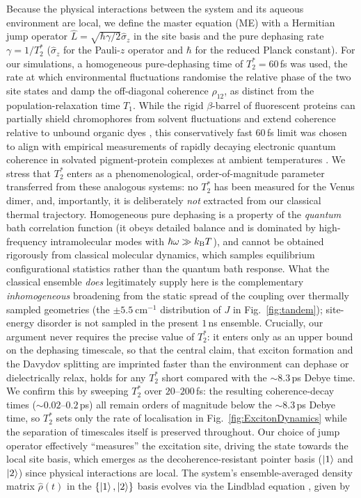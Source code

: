 \documentclass[journal=jpcbfk, manuscript=article, layout=twocolumn, doi=true]{achemso}
\begin{document}
Because the physical interactions between the system and its aqueous environment are local, we define the master equation (ME) with a Hermitian jump operator $\hat{L} = \sqrt{\hbar \gamma / 2} \hat{\sigma}_z$ in the site basis and the pure dephasing rate $\gamma = 1/T_2^*$ ($\hat{\sigma}_z$ for the Pauli-$z$ operator and $\hbar$ for the reduced Planck constant). For our simulations, a homogeneous pure-dephasing time of $T_2^* = 60$\,fs was used, the rate at which environmental fluctuations randomise the relative phase of the two site states and damp the off-diagonal coherence $\rho_{12}$, as distinct from the population-relaxation time $T_1$. While the rigid $\beta$-barrel of fluorescent proteins can partially shield chromophores from solvent fluctuations and extend coherence relative to unbound organic dyes \cite{kim2019venusa206}, this conservatively fast $60$\,fs limit was chosen to align with empirical measurements of rapidly decaying electronic quantum coherence in solvated pigment-protein complexes at ambient temperatures \cite{duan2017nature}. {We stress that $T_2^*$ enters as a phenomenological, order-of-magnitude parameter transferred from these analogous systems: no $T_2^*$ has been measured for the Venus dimer, and, importantly, it is deliberately \emph{not} extracted from our classical thermal trajectory. Homogeneous pure dephasing is a property of the \emph{quantum} bath correlation function (it obeys detailed balance and is dominated by high-frequency intramolecular modes with $\hbar\omega \gg k_{\rm B}T$), and cannot be obtained rigorously from classical molecular dynamics, which samples equilibrium configurational statistics rather than the quantum bath response. What the classical ensemble \emph{does} legitimately supply here is the complementary \emph{inhomogeneous} broadening from the static spread of the coupling over thermally sampled geometries (the $\pm 5.5~\mathrm{cm^{-1}}$ distribution of $J$ in Fig.~\ref{fig:tandem}); site-energy disorder is not sampled in the present $1$\,ns ensemble. Crucially, our argument never requires the precise value of $T_2^*$: it enters only as an upper bound on the dephasing timescale, so that the central claim, that exciton formation and the Davydov splitting are imprinted faster than the environment can dephase or dielectrically relax, holds for any $T_2^*$ short compared with the $\sim 8.3$\,ps Debye time. We confirm this by sweeping $T_2^*$ over $20$--$200$\,fs: the resulting coherence-decay times ($\sim 0.02$--$0.2$\,ps) all remain orders of magnitude below the $\sim 8.3$\,ps Debye time, so $T_2^*$ sets only the rate of localisation in Fig.~\ref{fig:ExcitonDynamics} while the separation of timescales itself is preserved throughout.} Our choice of jump operator effectively ``measures'' the excitation site, driving the state towards the local site basis, which emerges as the decoherence-resistant pointer basis ($\ket{1}$ and $\ket{2}$) since physical interactions are local. The system's ensemble-averaged density matrix $\hat{\rho}(t)$ in the $\{\ket{1},\ket{2}\}$ basis evolves via the Lindblad equation \cite{manzano2020short}, given by
\end{document}
